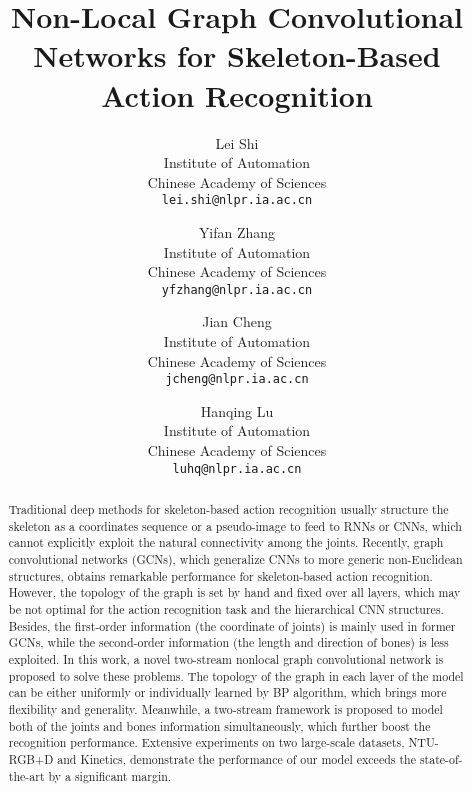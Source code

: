 \documentclass[10pt,twocolumn,letterpaper]{article}
\begin{document}
\title{Non-Local Graph Convolutional Networks for Skeleton-Based Action Recognition}

\author{
	Lei Shi \\
	Institute of Automation	\\
	Chinese Academy of Sciences\\
	{\tt\small lei.shi@nlpr.ia.ac.cn} 
	\and
	Yifan Zhang \\
	Institute of Automation	\\
	Chinese Academy of Sciences\\
	{\tt\small yfzhang@nlpr.ia.ac.cn} 
	\and
	Jian Cheng \\
	Institute of Automation	\\
	Chinese Academy of Sciences\\
	{\tt\small jcheng@nlpr.ia.ac.cn} 
	\and
	Hanqing Lu \\
	Institute of Automation	\\
	Chinese Academy of Sciences\\
	{\tt\small luhq@nlpr.ia.ac.cn} 
}

\maketitle

\begin{abstract}
        Traditional deep methods for skeleton-based action recognition usually structure the skeleton as a coordinates sequence or a pseudo-image to feed to RNNs or CNNs, which cannot explicitly exploit the natural connectivity among the joints. 
       Recently, graph convolutional networks (GCNs), which generalize CNNs to more generic non-Euclidean structures, obtains remarkable performance for skeleton-based action recognition. 
       However, the topology of the graph is set by hand and fixed over all layers, which may be not optimal for the action recognition task and the hierarchical CNN structures. Besides, the first-order information (the coordinate of joints) is mainly used in former GCNs, while the second-order information (the length and direction of bones) is less exploited.
In this work, a novel two-stream nonlocal graph convolutional network is proposed to solve these problems. The topology of the graph in each layer of the model can be either uniformly or individually learned by BP algorithm, which brings more flexibility and generality. Meanwhile, a two-stream framework is proposed to model both of the joints and bones information simultaneously, which further boost the recognition performance. 
       Extensive experiments on two large-scale datasets, NTU-RGB+D and Kinetics, demonstrate the performance of our model exceeds the state-of-the-art by a significant margin.
	\end{abstract}
    
\end{document}
